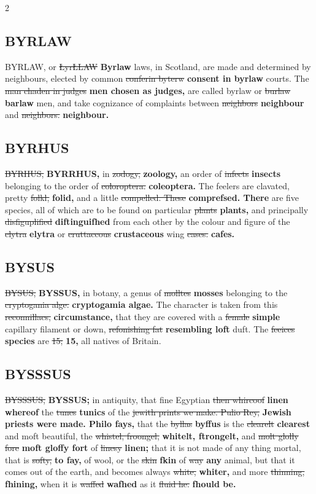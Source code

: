 \documentclass[10pt]{article}
\begin{document}
\begin{multicols}{2}
\subsection*{BYRLAW}
BYRLAW, or \sout{ŁyrŁLAW} \textbf{Byrlaw} laws, in Scotland, are made and determined by neighbours, elected by common \sout{conferin byterw} \textbf{consent in byrlaw} courts. The \sout{man chaden in judges} \textbf{men chosen as judges,} are called byrlaw or \sout{burlaw} \textbf{barlaw} men, and take cognizance of complaints between \sout{neighbors} \textbf{neighbour} and \sout{neighbors.} \textbf{neighbour.}

\subsection*{BYRHUS}
\sout{BYRHUS,} \textbf{BYRRHUS,} in \sout{zodogy,} \textbf{zoology,} an order of \sout{infects} \textbf{insects} belonging to the order of \sout{coloroptera.} \textbf{coleoptera.} The feelers are clavated, pretty \sout{folkl,} \textbf{folid,} and a little \sout{compelled. These} \textbf{comprefsed. There} are five species, all of which are to be found on particular \sout{plants} \textbf{plants,} and principally \sout{disfiguplified} \textbf{diftinguifhed} from each other by the colour and figure of the \sout{clytra} \textbf{elytra} or \sout{cruttaccous} \textbf{crustaceous} wing \sout{cases.} \textbf{cafes.}

\subsection*{BYSUS}
\sout{BYSUS,} \textbf{BYSSUS,} in botany, a genus of \sout{molltes} \textbf{mosses} belonging to the \sout{cryptogania alge.} \textbf{cryptogamia algae.} The character is taken from this \sout{reconnillacs,} \textbf{circumstance,} that they are covered with a \sout{female} \textbf{simple} capillary filament or down, \sout{refonishing fat} \textbf{resembling loft} duft. The \sout{feeices} \textbf{species} are \sout{15;} \textbf{15,} all natives of Britain.

\subsection*{BYSSSUS}
\sout{BYSSSUS,} \textbf{BYSSUS;} in antiquity, that fine Egyptian \sout{then whircoof} \textbf{linen whereof} the \sout{tunes} \textbf{tunics} of the \sout{jewith prints we make. Pulio Rey,} \textbf{Jewish priests were made. Philo fays,} that the \sout{byllas} \textbf{byffus} is the \sout{clearelt} \textbf{clearest} and moft beautiful, the \sout{whistel, froongel,} \textbf{whitelt, ftrongelt,} and \sout{molt glolly fore} \textbf{moft gloffy fort} of \sout{linesy} \textbf{linen;} that it is not made of any thing mortal, that is \sout{softy,} \textbf{to fay,} of wool, or the \sout{skin} \textbf{fkin} of \sout{way} \textbf{any} animal, but that it comes out of the earth, and becomes always \sout{white,} \textbf{whiter,} and more \sout{thinning,} \textbf{fhining,} when it is \sout{waffed} \textbf{wafhed} as it \sout{fluid he.} \textbf{fhould be.}


\end{multicols}
\end{document}
